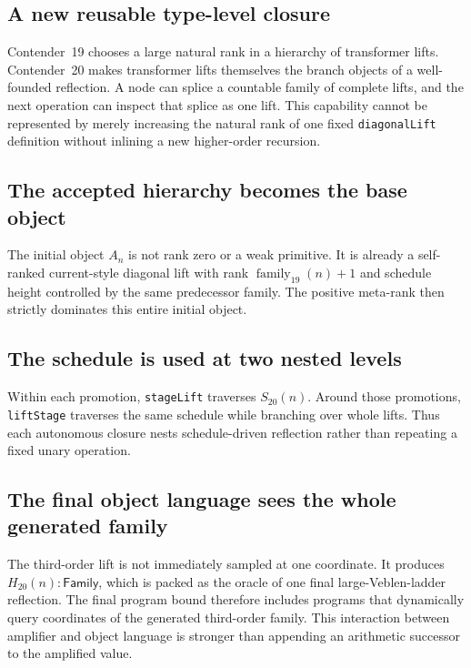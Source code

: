 \documentclass[11pt]{article}
\theoremstyle{definition}
\theoremstyle{remark}
\newcommand{\Family}{\mathsf{Family}}
\newcommand{\leanname}[1]{\nolinkurl{#1}}
\begin{document}
\subsection{A new reusable type-level closure}

Contender~19 chooses a large natural rank in a hierarchy of transformer lifts.
Contender~20 makes transformer lifts themselves the branch objects of a
well-founded reflection.  A node can splice a countable family of complete
lifts, and the next operation can inspect that splice as one lift.  This
capability cannot be represented by merely increasing the natural rank of one
fixed \leanname{diagonalLift} definition without inlining a new higher-order
recursion.

\subsection{The accepted hierarchy becomes the base object}

The initial object $A_n$ is not rank zero or a weak primitive.  It is already a
self-ranked current-style diagonal lift with rank
$\operatorname{family}_{19}(n)+1$ and schedule height controlled by the same
predecessor family.  The positive meta-rank then strictly dominates this entire
initial object.

\subsection{The schedule is used at two nested levels}

Within each promotion, \leanname{stageLift} traverses $S_{20}(n)$.  Around those
promotions, \leanname{liftStage} traverses the same schedule while branching
over whole lifts.  Thus each autonomous closure nests schedule-driven
reflection rather than repeating a fixed unary operation.

\subsection{The final object language sees the whole generated family}

The third-order lift is not immediately sampled at one coordinate.  It produces
$H_{20}(n):\Family$, which is packed as the oracle of one final
large-Veblen-ladder reflection.  The final program bound therefore includes
programs that dynamically query coordinates of the generated third-order
family.  This interaction between amplifier and object language is stronger
than appending an arithmetic successor to the amplified value.
\end{document}
